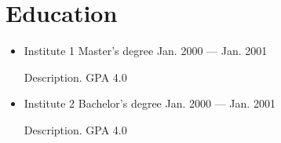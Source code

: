 \section{Education}

\begin{itemize}
	\item {
		\experience%
			{Institute 1}
			{Master's degree}
			{Jan. 2000 --- Jan. 2001}

		\par Description. GPA 4.0
	}

	\item {
		\experience%
			{Institute 2}
			{Bachelor's degree}
			{Jan. 2000 --- Jan. 2001}

		\par Description. GPA 4.0
	}
\end{itemize}

